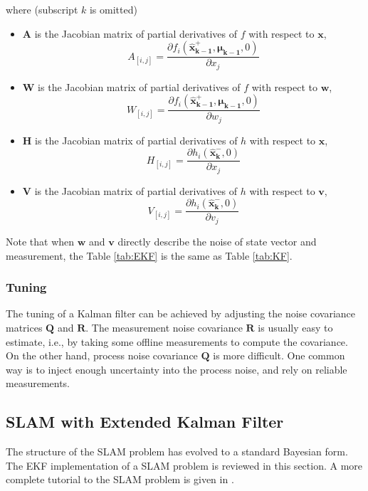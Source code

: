 \noindent where (subscript $k$ is omitted)
\begin{itemize}
  \item $\boldsymbol{A}$ is the Jacobian matrix of partial derivatives of $f$ with
  respect to $\boldsymbol{x}$, $$A_{[i,j]}= \frac{\partial f_i(\boldsymbol{\hat{x}_{k-1}^+},
    \boldsymbol{\mu_{k-1}}, 0)}{\partial x_j}$$
  \item $\boldsymbol{W}$ is the Jacobian matrix of partial derivatives of $f$ with
  respect to $\boldsymbol{w}$, $$W_{[i,j]}= \frac{\partial f_i(\boldsymbol{\hat{x}_{k-1}^+},
    \boldsymbol{\mu_{k-1}}, 0)}{\partial w_j}$$
  \item $\boldsymbol{H}$ is the Jacobian matrix of partial derivatives of $h$ with
  respect to $\boldsymbol{x}$, $$H_{[i,j]}= \frac{\partial h_i(\boldsymbol{\hat{x}_k^-},
    0)}{\partial x_j}$$
  \item $\boldsymbol{V}$ is the Jacobian matrix of partial derivatives of $h$ with
  respect to $\boldsymbol{v}$, $$V_{[i,j]}= \frac{\partial
    h_i(\boldsymbol{\hat{x}_k^-},0)}{\partial v_j}$$
\end{itemize}

\noindent Note that when $\boldsymbol{w}$ and $\boldsymbol{v}$ directly describe the noise of
state vector and measurement, the Table \ref{tab:EKF} is the same as
Table \ref{tab:KF}.

\subsubsection{Tuning}
The tuning of a Kalman filter can be achieved by adjusting the noise
covariance matrices $\boldsymbol{Q}$ and $\boldsymbol{R}$. The
measurement noise covariance $\boldsymbol{R}$ is usually easy to
estimate, i.e., by taking some offline measurements to compute the
covariance. On the other hand, process noise covariance
$\boldsymbol{Q}$ is more difficult. One common way is to inject enough
uncertainty into the process noise, and rely on reliable measurements.
 
\subsection{SLAM with Extended Kalman Filter}
The structure of the SLAM problem has evolved to a standard
Bayesian form. The EKF implementation of a SLAM problem is reviewed in
this section. A more complete tutorial to the SLAM problem is given in
\cite{durrant-whyte_simultaneous_2006}
\cite{bailey_simultaneous_2006}.

